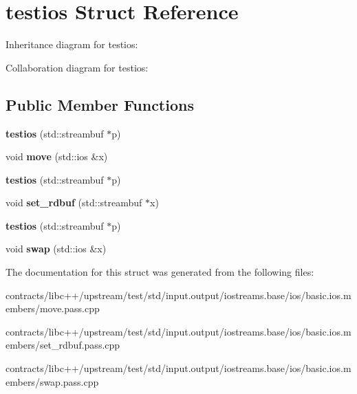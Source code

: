 \hypertarget{structtestios}{}\section{testios Struct Reference}
\label{structtestios}


Inheritance diagram for testios\+:


Collaboration diagram for testios\+:
\subsection*{Public Member Functions}
\begin{DoxyCompactItemize}
\item 
\mbox{\label{structtestios_a50fb375f168a442fe6cdaabd8b9db045}} 
{\bfseries testios} (std\+::streambuf $\ast$p)
\item 
\mbox{\label{structtestios_a60c02b55726c724f004d78bc9474ad13}} 
void {\bfseries move} (std\+::ios \&x)
\item 
\mbox{\label{structtestios_a50fb375f168a442fe6cdaabd8b9db045}} 
{\bfseries testios} (std\+::streambuf $\ast$p)
\item 
\mbox{\label{structtestios_abda5364752139b2d368ec032c221bfa5}} 
void {\bfseries set\+\_\+rdbuf} (std\+::streambuf $\ast$x)
\item 
\mbox{\label{structtestios_a50fb375f168a442fe6cdaabd8b9db045}} 
{\bfseries testios} (std\+::streambuf $\ast$p)
\item 
\mbox{\label{structtestios_a3131e199edd89648de25d050d5af9dd4}} 
void {\bfseries swap} (std\+::ios \&x)
\end{DoxyCompactItemize}


The documentation for this struct was generated from the following files\+:\begin{DoxyCompactItemize}
\item 
contracts/libc++/upstream/test/std/input.\+output/iostreams.\+base/ios/basic.\+ios.\+members/move.\+pass.\+cpp\item 
contracts/libc++/upstream/test/std/input.\+output/iostreams.\+base/ios/basic.\+ios.\+members/set\+\_\+rdbuf.\+pass.\+cpp\item 
contracts/libc++/upstream/test/std/input.\+output/iostreams.\+base/ios/basic.\+ios.\+members/swap.\+pass.\+cpp\end{DoxyCompactItemize}
